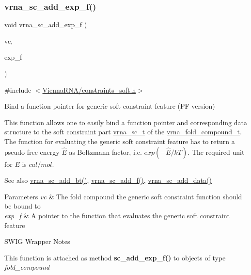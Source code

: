 \subsubsection{\texorpdfstring{vrna\+\_\+sc\+\_\+add\+\_\+exp\+\_\+f()}{vrna\_sc\_add\_exp\_f()}}
{\footnotesize\ttfamily void vrna\+\_\+sc\+\_\+add\+\_\+exp\+\_\+f (\begin{DoxyParamCaption}\item[{\mbox{\hyperlink{group__fold__compound_ga1b0cef17fd40466cef5968eaeeff6166}{vrna\+\_\+fold\+\_\+compound\+\_\+t}} $\ast$}]{vc,  }\item[{\mbox{\hyperlink{group__soft__constraints_ga4099978d410513edeeff8f3db13144c5}{vrna\+\_\+callback\+\_\+sc\+\_\+exp\+\_\+energy}} $\ast$}]{exp\+\_\+f }\end{DoxyParamCaption})}



{\ttfamily \#include $<$\mbox{\hyperlink{constraints__soft_8h}{Vienna\+R\+N\+A/constraints\+\_\+soft.\+h}}$>$}



Bind a function pointer for generic soft constraint feature (PF version) 

This function allows one to easily bind a function pointer and corresponding data structure to the soft constraint part \mbox{\hyperlink{group__soft__constraints_ga75401ce219ef8dbcceb672db82d434c6}{vrna\+\_\+sc\+\_\+t}} of the \mbox{\hyperlink{group__fold__compound_ga1b0cef17fd40466cef5968eaeeff6166}{vrna\+\_\+fold\+\_\+compound\+\_\+t}}. The function for evaluating the generic soft constraint feature has to return a pseudo free energy $ \hat{E} $ as Boltzmann factor, i.\+e. $ exp(- \hat{E} / kT) $. The required unit for $ E $ is $ cal/mol $.

\begin{DoxySeeAlso}{See also}
\mbox{\hyperlink{group__soft__constraints_gabde7d07a79bb9a8f4721aee247b674ea}{vrna\+\_\+sc\+\_\+add\+\_\+bt()}}, \mbox{\hyperlink{group__soft__constraints_ga8c7d907ec0125cd61c04e0908010a4e9}{vrna\+\_\+sc\+\_\+add\+\_\+f()}}, \mbox{\hyperlink{group__soft__constraints_ga15c6d52471ec97897e2bb7f964f5deb6}{vrna\+\_\+sc\+\_\+add\+\_\+data()}}
\end{DoxySeeAlso}

\begin{DoxyParams}{Parameters}
{\em vc} & The fold compound the generic soft constraint function should be bound to \\
\hline
{\em exp\+\_\+f} & A pointer to the function that evaluates the generic soft constraint feature\\
\hline
\end{DoxyParams}
\begin{DoxyRefDesc}{S\+W\+I\+G Wrapper Notes}
\item[\mbox{\hyperlink{wrappers__wrappers000024}{S\+W\+I\+G Wrapper Notes}}]This function is attached as method {\bfseries sc\+\_\+add\+\_\+exp\+\_\+f()} to objects of type {\itshape fold\+\_\+compound} \end{DoxyRefDesc}

